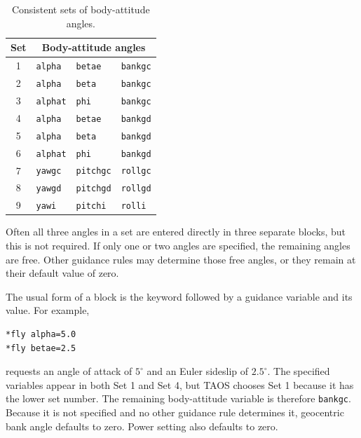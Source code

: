 \begin{table}[htbp]
  \centering
  \caption{Consistent sets of body-attitude angles.}
  \label{tab:consistent-body-attitude-sets}
  \begin{tabular}{@{}clll@{}}
    \toprule
    Set & \multicolumn{3}{c}{Body-attitude angles} \\
    \midrule
    1 & \texttt{alpha}  & \texttt{betae}   & \texttt{bankgc} \\
    2 & \texttt{alpha}  & \texttt{beta}    & \texttt{bankgc} \\
    3 & \texttt{alphat} & \texttt{phi}     & \texttt{bankgc} \\
    4 & \texttt{alpha}  & \texttt{betae}   & \texttt{bankgd} \\
    5 & \texttt{alpha}  & \texttt{beta}    & \texttt{bankgd} \\
    6 & \texttt{alphat} & \texttt{phi}     & \texttt{bankgd} \\
    7 & \texttt{yawgc}  & \texttt{pitchgc} & \texttt{rollgc} \\
    8 & \texttt{yawgd}  & \texttt{pitchgd} & \texttt{rollgd} \\
    9 & \texttt{yawi}   & \texttt{pitchi}  & \texttt{rolli} \\
    \bottomrule
  \end{tabular}
\end{table}

Often all three angles in a set are entered directly in three separate
 blocks, but this is not required. If only one or two angles are
specified, the remaining angles are free. Other guidance rules may determine those
free angles, or they remain at their default value of zero.

The usual form of a  block is the keyword followed by a
guidance variable and its value. For example,

\begin{lstlisting}[style=taosmanual]
*fly alpha=5.0
*fly betae=2.5
\end{lstlisting}

requests an angle of attack of $5^\circ$ and an Euler sideslip of $2.5^\circ$. The
specified variables appear in both Set 1 and Set 4, but TAOS chooses Set 1 because it
has the lower set number. The remaining body-attitude variable is therefore
\texttt{bankgc}. Because it is not specified and no other guidance rule determines
it, geocentric bank angle defaults to zero. Power setting also defaults to zero.

